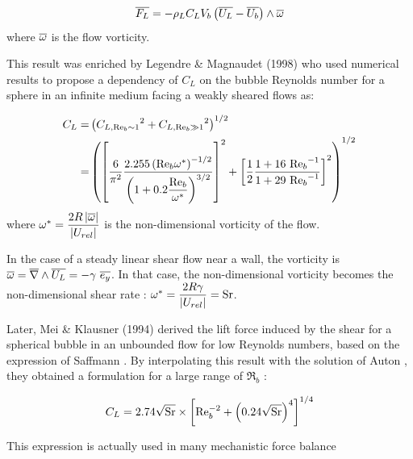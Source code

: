 \begin{equation}
\overline{F_{L}} = - \rho_{L} C_{L} V_{b} \left( \overline{U_{L}} - \overline{U_{b}} \right) \wedge \overline{\omega} 
\end{equation} 
where $\overline{\omega}$ is the flow vorticity.

\npar
This result was enriched by Legendre \& Magnaudet (1998) \cite{legendre_lift_1998bis} who used numerical results to propose a dependency of $C_{L}$ on the bubble Reynolds number for a sphere in an infinite medium facing a weakly sheared flows as:

\begin{align}
C_{L} =&\left(  {C_{L,\mathrm{Re}_{b} \sim 1}}^{2} + {C_{L,\mathrm{Re}_{b} \gg 1}}^{2}  \right)^{1/2}\\
 =&\left(  \left[ \frac{6}{\pi^{2}} \frac{2.255 \left( \mathrm{Re}_{b}\omega^{*} \right)^{-1/2}}{ \left( 1+0.2\dfrac{\mathrm{Re}_{b}}{\omega^{*}} \right)^{3/2} } \right]^{2} + \left[  \frac{1}{2} \frac{1+16\ {\mathrm{Re}_{b}}^{-1}}{1+29\ {\mathrm{Re}_{b}}^{-1}}  \right]^{2}  \right)^{1/2}
\end{align} 
where $\omega^{*} = \dfrac{2R\left| \overline{\omega} \right|}{\left| U_{rel} \right|}$ is the non-dimensional vorticity of the flow.

\begin{remark*}{}
In the case of a steady linear shear flow near a wall, the vorticity is $\overline{\omega}=\overline{\nabla} \wedge \overline{U_{L}}=-\gamma\ \overline{e_{y}}$. In that case, the non-dimensional vorticity becomes the non-dimensional shear rate : $\omega^{*} = \dfrac{2R\gamma}{\left| U_{rel} \right|} = \mathrm{Sr}$.
\end{remark*}


\npar

Later, Mei \& Klausner (1994) \cite{mei_klausner_lift} derived the lift force induced by the shear for a spherical bubble in an unbounded flow for low Reynolds numbers, based on the expression of Saffmann \cite{saffman_lift_particle}. By interpolating this result with the solution of Auton \cite{auton_lift_1987}, they obtained a formulation for a large range of $\Re_{b}$ :

\begin{equation}
C_{L} = 2.74 \sqrt{\mathrm{Sr}} \times \left[ \mathrm{Re}_{b}^{-2} + \left( 0.24\sqrt{\mathrm{Sr}} \right)^{4} \right]^{1/4}
\label{eq:lift_mei}
\end{equation}

This expression is actually used in many mechanistic force balance \cite{klausner_vapor_1993, chen_prediction_2012, sugrue_modified_2016, ren_development_2020} \cite{chen_prediction_2012} \cite{ren_development_2020} 


